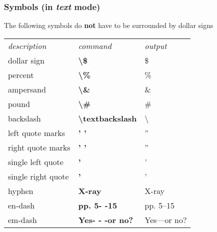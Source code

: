 \documentclass{article}
\begin{document}
\subsubsection{Symbols (in \textit{text} mode)}
The following symbols do \textbf{not} have to be surrounded by dollar signs
\begin{table}[H]
 \begin{tabular}{lll}
  \textit{description} &\textit{command} &\textit{output}\\
  dollar sign &\textbf{\textbackslash \$} &\$\\
  percent &\textbf{\textbackslash \%} &\%\\
  ampersand &\textbf{\textbackslash \&} &\&\\
  pound &\textbf{\textbackslash \#} &\#\\
  backslash &\textbf{\textbackslash textbackslash} &\textbackslash\\
  left quote marks &\textbf{' '} &''\\
  right quote marks &\textbf{' '} &''\\
  single left quote &\textbf{'} &'\\
  single right quote &\textbf{'} &'\\
  hyphen &\textbf{X-ray} &X-ray\\
  en-dash &\textbf{pp. 5- -15} &pp. 5--15\\
  em-dash &\textbf{Yes- - -or no?} &Yes---or no?\\
 \end{tabular} 
\end{table}
\end{document}
